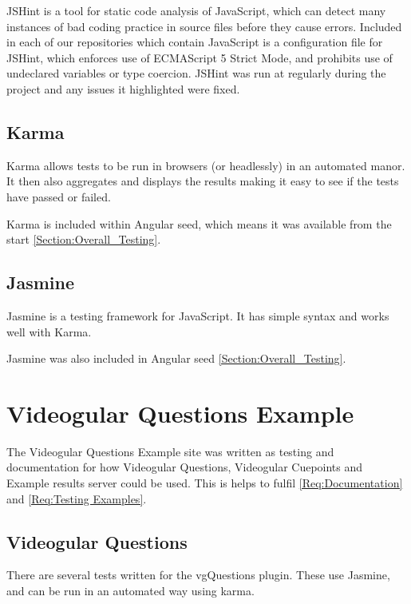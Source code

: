 JSHint is a tool for static code analysis of JavaScript, which can detect many instances of bad coding practice in source files before they cause errors. Included in each of our repositories which contain JavaScript is a configuration file for JSHint, which enforces use of ECMAScript 5 Strict Mode, and prohibits use of undeclared variables or type coercion. JSHint was run at regularly during the project and any issues it highlighted were fixed.

\subsection{Karma}

Karma allows tests to be run in browsers (or headlessly) in an automated manor.  It then also aggregates and displays the results making it easy to see if the tests have passed or failed.

Karma is included within Angular seed, which means it was available from the start \autoref{Section:Overall_Testing}.

\subsection{Jasmine}

Jasmine is a testing framework for JavaScript. It has simple syntax and works well with Karma.

Jasmine was also included in Angular seed \autoref{Section:Overall_Testing}.

\section{Videogular Questions Example} 
\label{Section:Videogular Questions Example}

The Videogular Questions Example site was written as testing and documentation for how Videogular Questions, Videogular Cuepoints and Example results server could be used. This is helps to fulfil \cref{Req:Documentation} and \cref{Req:Testing Examples}.

\subsection{Videogular Questions}
\label{Subsection:Videogular Questions in example}

There are several tests written for the \gls{vgQuestions} plugin. These use Jasmine, and can be run in an automated way using karma.

